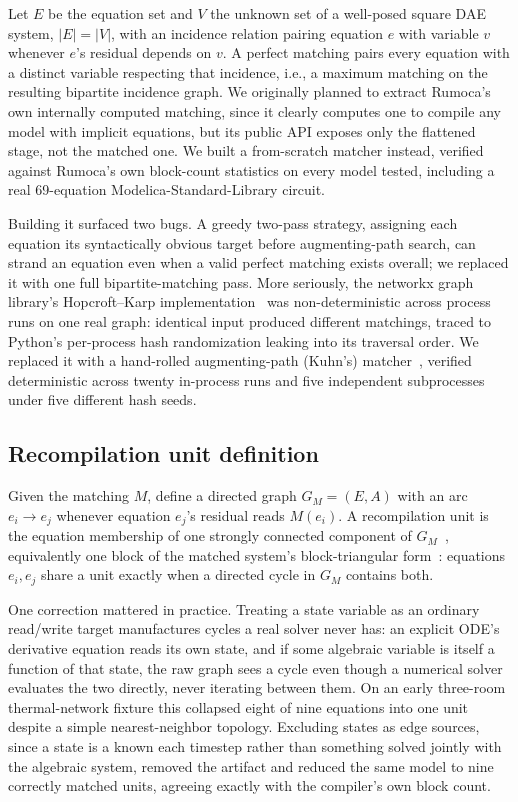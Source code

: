 \documentclass[journal]{IEEEtran}
\begin{document}
Let $E$ be the equation set and $V$ the unknown set of a well-posed square DAE system, $|E|=|V|$, with an incidence relation pairing equation $e$ with variable $v$ whenever $e$'s residual depends on $v$. A perfect matching pairs every equation with a distinct variable respecting that incidence, i.e., a maximum matching on the resulting bipartite incidence graph. We originally planned to extract Rumoca's own internally computed matching, since it clearly computes one to compile any model with implicit equations, but its public API exposes only the flattened stage, not the matched one. We built a from-scratch matcher instead, verified against Rumoca's own block-count statistics on every model tested, including a real 69-equation Modelica-Standard-Library circuit.

Building it surfaced two bugs. A greedy two-pass strategy, assigning each equation its syntactically obvious target before augmenting-path search, can strand an equation even when a valid perfect matching exists overall; we replaced it with one full bipartite-matching pass. More seriously, the networkx graph library's Hopcroft--Karp implementation~\cite{hopcroft1973n52} was non-deterministic across process runs on one real graph: identical input produced different matchings, traced to Python's per-process hash randomization leaking into its traversal order. We replaced it with a hand-rolled augmenting-path (Kuhn's) matcher~\cite{kuhn1955hungarian}, verified deterministic across twenty in-process runs and five independent subprocesses under five different hash seeds.

\subsection{Recompilation unit definition}

Given the matching $M$, define a directed graph $G_M=(E,A)$ with an arc $e_i \to e_j$ whenever equation $e_j$'s residual reads $M(e_i)$. A recompilation unit is the equation membership of one strongly connected component of $G_M$~\cite{tarjan1972depth}, equivalently one block of the matched system's block-triangular form~\cite{duff1978implementation}: equations $e_i,e_j$ share a unit exactly when a directed cycle in $G_M$ contains both.

One correction mattered in practice. Treating a state variable as an ordinary read/write target manufactures cycles a real solver never has: an explicit ODE's derivative equation reads its own state, and if some algebraic variable is itself a function of that state, the raw graph sees a cycle even though a numerical solver evaluates the two directly, never iterating between them. On an early three-room thermal-network fixture this collapsed eight of nine equations into one unit despite a simple nearest-neighbor topology. Excluding states as edge sources, since a state is a known each timestep rather than something solved jointly with the algebraic system, removed the artifact and reduced the same model to nine correctly matched units, agreeing exactly with the compiler's own block count.
\end{document}
